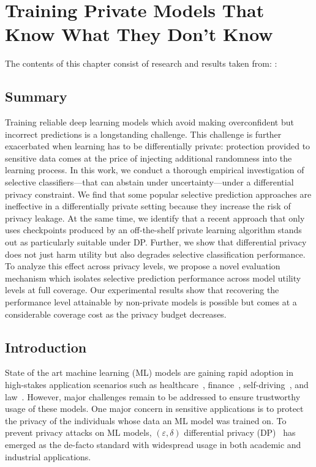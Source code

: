 \chapter{Training Private Models That Know What They Don't Know}
\label{ch:sptd_dp}

\begin{paperref}
\normalfont
The contents of this chapter consist of research and results taken from: \citet{rabanser2023training}: \emph{}
\end{paperref}


\section*{Summary}

Training reliable deep learning models which avoid making overconfident but incorrect predictions is a longstanding challenge. This challenge is further exacerbated when learning has to be differentially private: protection provided to sensitive data comes at the price of injecting additional randomness into the learning process. In this work, we conduct a thorough empirical investigation of selective classifiers---that can abstain under uncertainty---under a differential privacy constraint. We find that some popular selective prediction approaches are ineffective in a differentially private setting because they increase the risk of privacy leakage. At the same time, we identify that a recent approach that only uses checkpoints produced by an off-the-shelf private learning algorithm stands out as particularly suitable under DP. Further, we show that differential privacy does not just harm utility but also degrades selective classification performance. To analyze this effect across privacy levels, we propose a novel evaluation mechanism which isolates selective prediction performance across model utility levels at full coverage. Our experimental results show that recovering the performance level attainable by non-private models is possible but comes at a considerable coverage cost as the privacy budget decreases.

\section{Introduction}
\label{sec:intro}

State of the art machine learning (ML) models are gaining rapid adoption in high-stakes application scenarios such as healthcare~\citep{challen2019artificial, mozannar2020consistent}, finance~\citep{vijh2020stock}, self-driving~\citep{ghodsi2021generating}, and law~\citep{vieira2021understanding}. However, major challenges remain to be addressed to ensure trustworthy usage of these models. One major concern in sensitive applications is to protect the privacy of the individuals whose data an ML model was trained on. To prevent privacy attacks on ML models, $(\varepsilon, \delta)$ differential privacy (DP)~\citep{dwork2014algorithmic} has emerged as the de-facto standard with widespread usage in both academic and industrial applications. 

